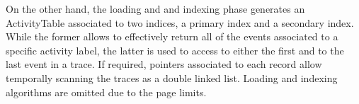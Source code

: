 
On the other hand, the loading and and indexing phase generates an \textsf{ActivityTable} associated to two indices, a primary index and a secondary index. While the former allows to effectively return all of the events associated to a specific activity label, the latter is used to access to either the first and to the last event in a trace. If required, pointers associated to each record allow temporally scanning the traces as a double linked list. 
Loading and indexing algorithms are omitted due to the page limits.



